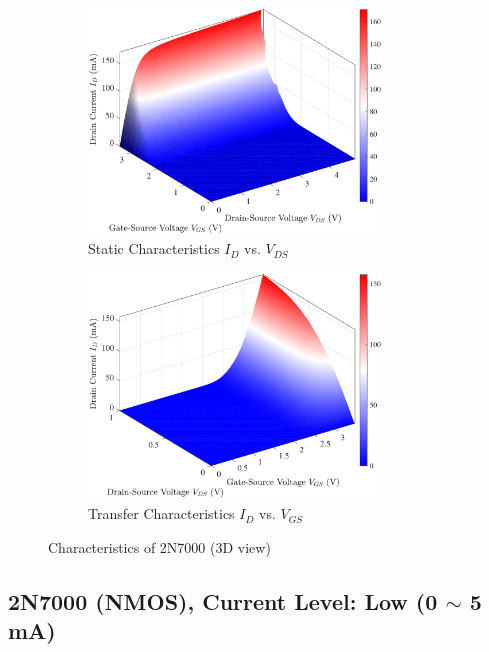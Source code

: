 \documentclass[UTF8]{article}
\begin{document}
\begin{figure}[H]\centering
\begin{subfigure}[b]{0.5\columnwidth}\centering
    \includegraphics[height=170pt]{LCE-04-场效应管/assets/2N7000 (NMOS) [onsemi, KH32] 3D current high/2025-04-24_21-05-11.pdf}
    \caption{Static Characteristics $I_D$ vs. $V_{DS}$}
\end{subfigure}\hfill
\begin{subfigure}[b]{0.5\columnwidth}\centering
    \includegraphics[height=170pt]{LCE-04-场效应管/assets/2N7000 (NMOS) [onsemi, KH32] 3D current high/2025-04-24_21-05-16.pdf}
    \caption{Transfer Characteristics $I_D$ vs. $V_{GS}$}
\end{subfigure}
\caption{Characteristics of 2N7000 (3D view)}
\end{figure}


\subsection{2N7000 (NMOS), Current Level: Low (0 $\sim$ 5 mA)}
\end{document}
